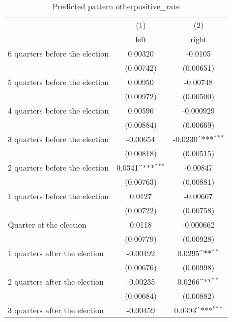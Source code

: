 \begin{table}[htbp]\centering
\def\sym#1{\ifmmode^{#1}\else\(^{#1}\)\fi}
\caption{Predicted pattern otherpositive\_rate}
\begin{tabular}{l*{2}{c}}
\hline\hline
                    &\multicolumn{1}{c}{(1)}&\multicolumn{1}{c}{(2)}\\
                    &\multicolumn{1}{c}{left}&\multicolumn{1}{c}{right}\\
\hline
 6 quarters before the election&     0.00320         &     -0.0105         \\
                    &   (0.00742)         &   (0.00651)         \\
[1em]
 5 quarters before the election&     0.00950         &    -0.00748         \\
                    &   (0.00972)         &   (0.00500)         \\
[1em]
 4 quarters before the election&     0.00596         &   -0.000929         \\
                    &   (0.00884)         &   (0.00669)         \\
[1em]
 3 quarters before the election&    -0.00654         &     -0.0230\sym{***}\\
                    &   (0.00818)         &   (0.00515)         \\
[1em]
 2 quarters before the election&      0.0341\sym{***}&    -0.00847         \\
                    &   (0.00763)         &   (0.00881)         \\
[1em]
 1 quarters before the election&      0.0127         &    -0.00667         \\
                    &   (0.00722)         &   (0.00758)         \\
[1em]
Quarter of the election&      0.0118         &   -0.000662         \\
                    &   (0.00779)         &   (0.00928)         \\
[1em]
 1 quarters after the election&    -0.00492         &      0.0295\sym{**} \\
                    &   (0.00676)         &   (0.00998)         \\
[1em]
 2 quarters after the election&    -0.00235         &      0.0266\sym{**} \\
                    &   (0.00684)         &   (0.00882)         \\
[1em]
 3 quarters after the election&    -0.00459         &      0.0393\sym{***}\\

\end{tabular}
\end{table}
